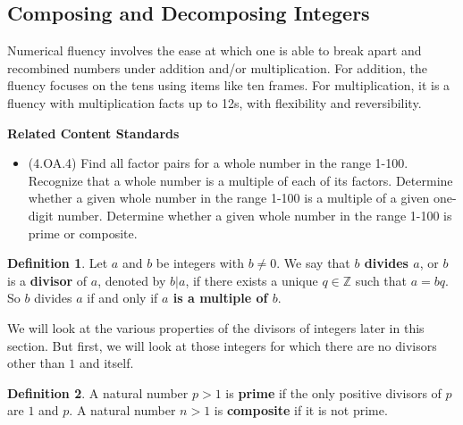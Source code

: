 \documentclass[
]{book}
\providecommand{\tightlist}{%
  \setlength{\itemsep}{0pt}\setlength{\parskip}{0pt}}
\newenvironment{standards}{}{}
\theoremstyle{definition}
\newtheorem{definition}{Definition}[chapter]
\theoremstyle{definition}
\theoremstyle{definition}
\theoremstyle{definition}
\theoremstyle{remark}
\begin{document}
\hypertarget{composing-and-decomposing-integers}{%
\subsection{Composing and Decomposing Integers}\label{composing-and-decomposing-integers}}

Numerical fluency involves the ease at which one is able to break apart and recombined numbers under addition and/or multiplication. For addition, the fluency focuses on the tens using items like ten frames. For multiplication, it is a fluency with multiplication facts up to 12s, with flexibility and reversibility.

\begin{standards}

\begin{center}
\textbf{Related Content Standards}

\end{center}

\begin{itemize}
\tightlist
\item
  (4.OA.4) Find all factor pairs for a whole number in the range 1-100. Recognize that a whole number is a multiple of each of its factors. Determine whether a given whole number in the range 1-100 is a multiple of a given one-digit number. Determine whether a given whole number in the range 1-100 is prime or composite.
\end{itemize}

\end{standards}

\begin{definition}
\protect\hypertarget{def:divisor}{}\label{def:divisor}Let \(a\) and \(b\) be integers with \(b\neq 0\). We say that \textbf{\(b\) divides \(a\)}, or \(b\) is a \textbf{divisor} of \(a\), denoted by \(b|a\), if there exists a unique \(q\in \mathbb{Z}\) such that \(a=bq\). So \(b\) divides \(a\) if and only if \textbf{\(a\) is a multiple of \(b\)}.
\end{definition}

We will look at the various properties of the divisors of integers later in this section. But first, we will look at those integers for which there are no divisors other than \(1\) and itself.

\begin{definition}
\protect\hypertarget{def:primecomposite}{}\label{def:primecomposite}A natural number \(p>1\) is \textbf{prime} if the only positive divisors of \(p\) are \(1\) and \(p\). A natural number \(n>1\) is \textbf{composite} if it is not prime.
\end{definition}
\end{document}
